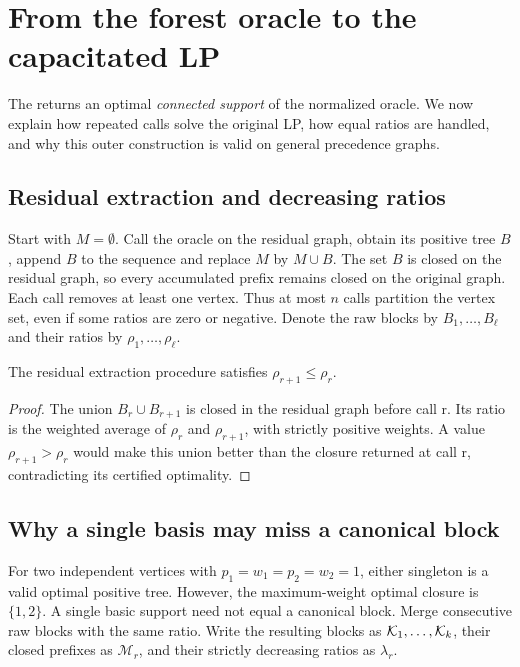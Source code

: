 \section{From the forest oracle to the capacitated LP}\label{sec:outer}

The \FS{} returns an optimal \emph{connected support} of the normalized
oracle. We now explain how repeated calls solve the original LP, how equal
ratios are handled, and why this outer construction is valid on general
precedence graphs.

\subsection{Residual extraction and decreasing ratios}
Start with $M=\emptyset$. Call the oracle on the residual graph, obtain its
positive tree $B$, append $B$ to the sequence and replace $M$ by $M\cup B$.
The set $B$ is closed on the residual graph, so every accumulated prefix
remains closed on the original graph. Each call removes at least one vertex.
Thus at most $n$ calls partition the vertex set, even if some ratios are zero
or negative. Denote the raw blocks by $B_1,\ldots,B_\ell$ and their ratios
by $\rho_1,\ldots,\rho_\ell$.

\begin{lemma}\label{lem:ratios}
The residual extraction procedure satisfies $\rho_{r+1}\le\rho_r$.
\end{lemma}
\begin{proof}
The union $B_r\cup B_{r+1}$ is closed in the residual graph before call r.
Its ratio is the weighted average of $\rho_r$ and $\rho_{r+1}$, with strictly
positive weights. A value $\rho_{r+1}>\rho_r$ would make this union better
than the closure returned at call r, contradicting its certified optimality.
\end{proof}

\subsection{Why a single basis may miss a canonical block}
For two independent vertices with $p_1=w_1=p_2=w_2=1$, either singleton is a
valid optimal positive tree. However, the maximum-weight optimal closure
is $\{1,2\}$. A single basic support need not equal a canonical block.
Merge consecutive raw blocks with the same ratio. Write the resulting blocks
as $\mathcal K_1,\ldots,\mathcal K_k$, their closed prefixes as $\mathcal M_r$, and
their strictly decreasing ratios as $\lambda_r$.

